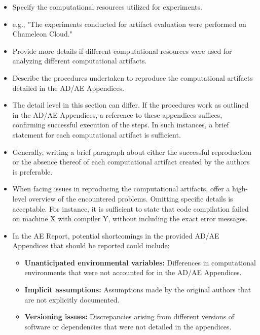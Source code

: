 \documentclass[conference]{IEEEtran}
\begin{document}
\begin{aerhint}
\begin{itemize}
    \item Specify the computational resources utilized for experiments.
    \item e.g., "The experiments conducted for artifact evaluation were performed on Chameleon Cloud."
    \item Provide more details if different computational resources were used for analyzing different computational artifacts.
\end{itemize}
\end{aerhint}

\aerwhat


\begin{aerhint}
\begin{itemize}
    \item Describe the procedures undertaken to reproduce the computational artifacts detailed in the AD/AE Appendices.
    \item The detail level in this section can differ. If the procedures work as outlined in the AD/AE Appendices, a reference to these appendices suffices, confirming successful execution of the steps.
    In such instances, a brief statement for each computational artifact is sufficient.
    \item Generally, writing a brief paragraph about either the successful reproduction or the absence thereof of each computational artifact created by the authors is preferable.
    \item When facing issues in reproducing the computational artifacts, offer a high-level overview of the encountered problems. Omitting specific details is acceptable. For instance, it is sufficient to state that code compilation failed on machine X with compiler Y, without including the exact error messages.
    \item In the AE Report, potential shortcomings in the provided AD/AE Appendices that should be reported could include:
    \begin{itemize}
        \item \textbf{Unanticipated environmental variables:} Differences in computational environments that were not accounted for in the AD/AE Appendices.
        \item \textbf{Implicit assumptions:} Assumptions made by the original authors that are not explicitly documented.
        \item \textbf{Versioning issues:} Discrepancies arising from different versions of software or dependencies that were not detailed in the appendices.

\end{itemize}
\end{itemize}
\end{aerhint}
\end{document}
